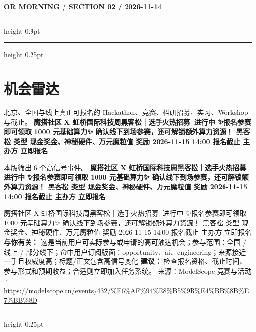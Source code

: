 \documentclass[10.5pt]{ctexart}
\begin{document}
\newpage
{\small\bfseries OR MORNING / SECTION 02 / 2026-11-14}
\vspace{2mm}
\hrule height 0.9pt
\vspace{1.5mm}
\hrule height 0.25pt
\vspace{4mm}
\section*{机会雷达}
{\color{ormuted} 北京、全国与线上真正可报名的 Hackathon、竞赛、科研招募、实习、Workshop 与截止。}
\vspace{2mm}
{\LARGE\bfseries 魔搭社区 X 虹桥国际科技周黑客松｜选手火热招募🚀 进行中 ✨报名参赛即可领取 1000 元基础算力✨ 确认线下到场参赛，还可解锁额外算力资源！ 黑客松 类型 现金奖金、神秘硬件、万元魔粒值 奖励 2026-11-15 14:00 报名截止 主办方 立即报名}\par
\vspace{1mm}
{\color{ormuted} 本版筛出 6 个高信号事件。}
\vspace{3mm}
{\Large\bfseries 魔搭社区 X 虹桥国际科技周黑客松｜选手火热招募🚀 进行中 ✨报名参赛即可领取 1000 元基础算力✨ 确认线下到场参赛，还可解锁额外算力资源！ 黑客松 类型 现金奖金、神秘硬件、万元魔粒值 奖励 2026-11-15 14:00 报名截止 主办方 立即报名}\par
魔搭社区 X 虹桥国际科技周黑客松｜选手火热招募🚀 进行中 ✨报名参赛即可领取 1000 元基础算力✨ 确认线下到场参赛，还可解锁额外算力资源！ 黑客松 类型 现金奖金、神秘硬件、万元魔粒值 奖励 2026-11-15 14:00 报名截止 主办方 立即报名
\textbf{与你有关：} 这是当前用户可实际参与或申请的高可触达机会；参与范围：全国 / 线上 / 部分线下；命中用户订阅版面：opportunity、ai、engineering；来源接近一手且权威度高；标题/正文包含高信号变化
\textbf{建议：} 检查报名资格、截止时间、参与形式和预期收益；合适则立即加入任务系统。
{\footnotesize\color{ormuted} 来源：ModelScope 竞赛与活动 · \url{https://modelscope.cn/events/432/%E6%AF%94%E8%B5%9B%E4%BB%8B%E7%BB%8D}}
\vspace{4mm}
\hrule height 0.25pt
\vspace{3mm}
\end{document}

